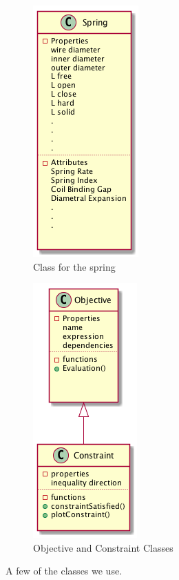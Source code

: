\documentclass[10pt]{article}
\begin{document}
\begin{figure}[h]
			\begin{subfigure}{.5\textwidth}
				\centering
				\includegraphics[scale=.5]{Spring_Class.png}
				\caption{Class for the spring}
				\label{fig:Spring_Class}
			\end{subfigure}%
			\begin{subfigure}{.5\textwidth}
				  \centering
		 		\includegraphics[scale=.5]{Objective_Constraint.png}
				\caption{Objective and Constraint Classes}
				  \label{fig:Objective_Constraint}
		  		
			\end{subfigure}
			 \label{fig:Classes}
		  \caption{A few of the classes we use.}
		\end{figure}
\end{document}
